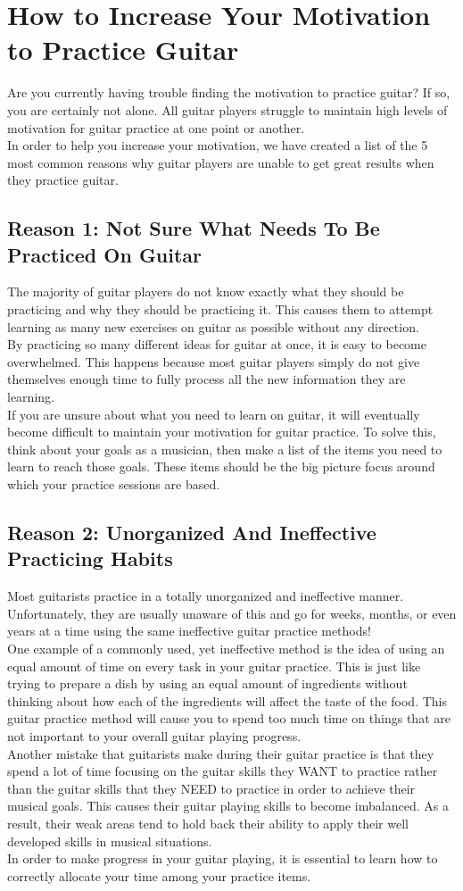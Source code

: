 \section{How to Increase Your Motivation to Practice Guitar}
Are you currently having trouble finding the motivation to practice guitar? If so, you are certainly not alone. All guitar players struggle to maintain high levels of motivation for guitar practice at one point or another.\\
In order to help you increase your motivation, we have created a list of the 5 most common reasons why guitar players are unable to get great results when they practice guitar.
\subsection*{Reason 1: Not Sure What Needs To Be Practiced On Guitar}
The majority of guitar players do not know exactly what they should be practicing and why they should be practicing it. This causes them to attempt learning as many new exercises on guitar as possible without any direction.\\
By practicing so many different ideas for guitar at once, it is easy to become overwhelmed. This happens because most guitar players simply do not give themselves enough time to fully process all the new information they are learning.\\
If you are unsure about what you need to learn on guitar, it will eventually become difficult to maintain your motivation for guitar practice. To solve this, think about your goals as a musician, then make a list of the items you need to learn to reach those goals. These items should be the big picture focus around which your practice sessions are based.
\subsection*{Reason 2: Unorganized And Ineffective Practicing Habits}
Most guitarists practice in a totally unorganized and ineffective manner. Unfortunately, they are usually unaware of this and go for weeks, months, or even years at a time using the same ineffective guitar practice methods!\\
One example of a commonly used, yet ineffective method is the idea of using an equal amount of time on every task in your guitar practice. This is just like trying to prepare a dish by using an equal amount of ingredients without thinking about how each of the ingredients will affect the taste of the food. This guitar practice method will cause you to spend too much time on things that are not important to your overall guitar playing progress.\\
Another mistake that guitarists make during their guitar practice is that they spend a lot of time focusing on the guitar skills they WANT to practice rather than the guitar skills that they NEED to practice in order to achieve their musical goals. This causes their guitar playing skills to become imbalanced. As a result, their weak areas tend to hold back their ability to apply their well developed skills in musical situations.\\
In order to make progress in your guitar playing, it is essential to learn how to correctly allocate your time among your practice items.
